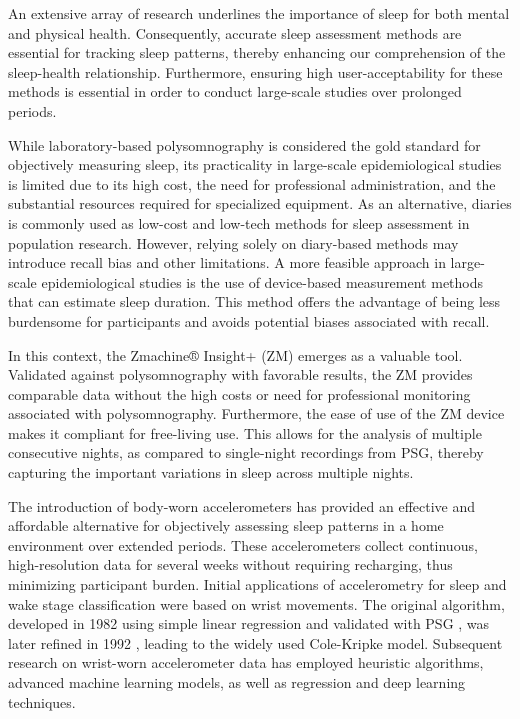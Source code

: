 \documentclass[
  super,
  preprint,
  3p]{elsarticle}
\begin{document}
An extensive array of research underlines the importance of sleep for
both mental and physical
health\citep{ma2017, meyer2022, kpavlova2019, difrancesco2019}.
Consequently, accurate sleep assessment methods are essential for
tracking sleep patterns, thereby enhancing our comprehension of the
sleep-health relationship. Furthermore, ensuring high user-acceptability
for these methods is essential in order to conduct large-scale studies
over prolonged periods.

While laboratory-based polysomnography is considered the gold standard
for objectively measuring sleep, its practicality in large-scale
epidemiological studies is limited due to its high cost, the need for
professional administration, and the substantial resources required for
specialized equipment\citep{vandewater2011}. As an alternative, diaries
is commonly used as low-cost and low-tech methods for sleep assessment
in population research. However, relying solely on diary-based methods
may introduce recall bias and other limitations\citep{moore2015}. A more
feasible approach in large-scale epidemiological studies is the use of
device-based measurement methods that can estimate sleep duration. This
method offers the advantage of being less burdensome for participants
and avoids potential biases associated with recall.

In this context, the Zmachine®️ Insight+ (ZM) emerges as a valuable
tool. Validated against polysomnography with favorable
results\citep{kaplan2014, wang2015}, the ZM provides comparable data
without the high costs or need for professional monitoring associated
with polysomnography. Furthermore, the ease of use of the ZM device
makes it compliant for free-living use\citep{pedersen2021}. This allows
for the analysis of multiple consecutive nights, as compared to
single-night recordings from PSG, thereby capturing the important
variations in sleep across multiple nights.

The introduction of body-worn accelerometers has provided an effective
and affordable alternative for objectively assessing sleep patterns in a
home environment over extended periods. These accelerometers collect
continuous, high-resolution data for several weeks without requiring
recharging, thus minimizing participant burden. Initial applications of
accelerometry for sleep and wake stage classification were based on
wrist movements. The original algorithm, developed in 1982 using simple
linear regression and validated with PSG \citep{webster1982}, was later
refined in 1992 \citep{cole1992}, leading to the widely used Cole-Kripke
model. Subsequent research on wrist-worn accelerometer data has employed
heuristic algorithms, advanced machine learning models, as well as
regression and deep learning
techniques\citep{palotti2019, cole1992, sazonov2004, sadeh1994, hees2015, sundararajan2021}.
\end{document}

